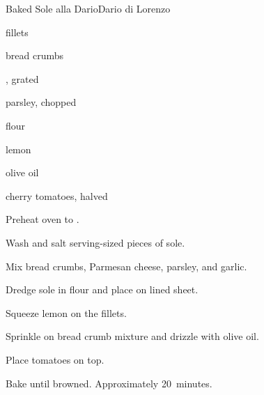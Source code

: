 \begin{recipe}{Baked Sole alla Dario}{Dario di Lorenzo}{}

\begin{ingredients}
\item {} fillets 
\item bread crumbs
\item {}, grated 
\item parsley, chopped
\item flour
\item lemon
\item olive oil
\item cherry tomatoes, halved
\end{ingredients}

\begin{directions}
\item Preheat oven to .
\item Wash and salt serving-sized pieces of sole.
\item Mix bread crumbs, Parmesan cheese, parsley, and garlic.
\item Dredge sole in flour and place on lined sheet.
\item Squeeze lemon on the fillets.
\item Sprinkle on bread crumb mixture and drizzle with olive oil.
\item Place tomatoes on top.
\item Bake until browned. Approximately 20~minutes.
\end{directions}

\end{recipe}
